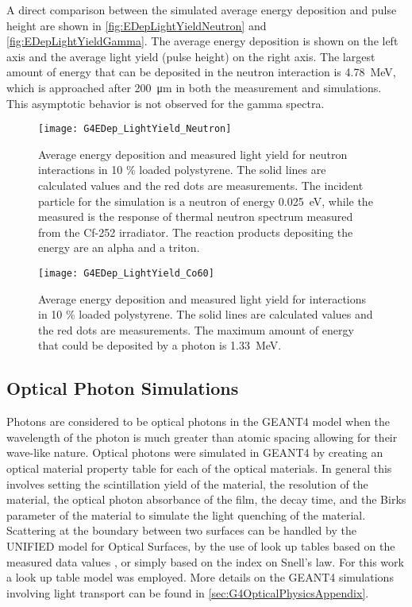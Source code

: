 A direct comparison between the simulated average energy deposition and pulse height are shown in \autoref{fig:EDepLightYieldNeutron} and \autoref{fig:EDepLightYieldGamma}. 
The average energy deposition is shown on the left axis and the average light yield (pulse height) on the right axis.
The largest amount of energy that can be deposited in the neutron interaction is \SI{4.78}{\MeV}, which is approached after \SI{200}{\um} in both the measurement and simulations.
This asymptotic behavior is not observed for the gamma spectra.
\begin{figure}
	\centering
    	\texttt{[image: G4EDep\_LightYield\_Neutron]}
	\caption[Average Light Yield and Energy Deposition for neutron interactions in PS]{Average energy deposition and measured light yield for neutron interactions in 10 \% loaded polystyrene. The solid lines are calculated values and the red dots are measurements. The incident particle for the simulation is a neutron of energy \SI{0.025}{\eV}, while the measured is the response of thermal neutron spectrum measured from the Cf-252 irradiator. The reaction products depositing the energy are an alpha and a triton.}
	\label{fig:EDepLightYieldNeutron}
\end{figure}
\begin{figure}
	\centering
    	\texttt{[image: G4EDep\_LightYield\_Co60]}
	\caption[Average Light Yield and Energy Deposition for Gamma interactions in PS]{Average energy deposition and measured light yield for  interactions in 10 \% loaded polystyrene. The solid lines are calculated values and the red dots are measurements. The maximum amount of energy that could be deposited by a  photon is \SI{1.33}{\MeV}.}
	\label{fig:EDepLightYieldGamma}
\end{figure}

\subsection{Optical Photon Simulations}
\label{sec:OpticalPhotonSims}
Photons are considered to be optical photons in the GEANT4 model when the wavelength of the photon is much greater than atomic spacing allowing for their wave-like nature.
Optical photons were simulated in GEANT4 by creating an optical material property table for each of the optical materials.
In general this involves setting the scintillation yield of the material, the resolution of the material, the optical photon absorbance of the film, the decay time, and the Birks parameter of the material to simulate the light quenching of the material.
Scattering at the boundary between two surfaces can be  handled by the UNIFIED model for Optical Surfaces, by the use of look up tables based on the measured data values \cite{5485130}, or simply based on the index on Snell's law.
For this work a look up table model was employed. More details on the GEANT4 simulations involving light transport can be found in \autoref{sec:G4OpticalPhysicsAppendix}.


